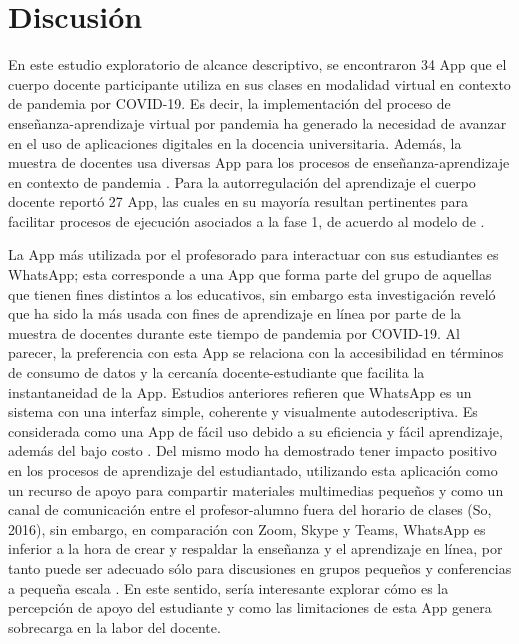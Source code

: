 \documentclass[spanish]{textolivre}
\begin{document}
\section{Discusión}
En este estudio exploratorio de alcance descriptivo, se encontraron 34 App que el cuerpo docente participante utiliza en sus clases en modalidad virtual en contexto de pandemia por COVID-19. Es decir, la implementación del proceso de enseñanza-aprendizaje virtual por pandemia ha generado la necesidad de avanzar en el uso de aplicaciones digitales en la docencia universitaria. Además, la muestra de docentes usa diversas App para los procesos de enseñanza-aprendizaje en contexto de pandemia \cite{zamora-antunano2021, almarzooq2020, budianto2021, akaloo2021, pramana2021}. Para la autorregulación del aprendizaje el cuerpo docente reportó 27 App, las cuales en su mayoría resultan pertinentes para facilitar procesos de ejecución asociados a la fase 1, de acuerdo al modelo de \textcite[p. 142]{zimmerman2013}.

La App más utilizada por el profesorado para interactuar con sus estudiantes es WhatsApp; esta corresponde a una App que forma parte del grupo de aquellas que tienen fines distintos a los educativos, sin embargo esta investigación reveló que ha sido la más usada con fines de aprendizaje en línea por parte de la muestra de docentes durante este tiempo de pandemia por COVID-19. Al parecer, la preferencia con esta App se relaciona con la accesibilidad en términos de consumo de datos y la cercanía docente-estudiante que facilita la instantaneidad de la App. Estudios anteriores refieren que WhatsApp es un sistema con una interfaz simple,  coherente y visualmente autodescriptiva. Es considerada como una App de fácil uso debido a su eficiencia y fácil aprendizaje, además del bajo costo \cite{correia2020}. Del mismo modo ha demostrado tener impacto positivo en los procesos de aprendizaje del estudiantado, utilizando esta aplicación como un recurso de apoyo para compartir materiales multimedias pequeños y como un canal de comunicación entre el profesor-alumno fuera del horario de clases (So, 2016), sin embargo, en comparación con Zoom, Skype y Teams, WhatsApp es inferior a la hora de crear y respaldar la enseñanza y el aprendizaje en línea, por tanto puede ser adecuado sólo para discusiones en grupos pequeños y conferencias a pequeña escala \cite{correia2020}. En este sentido, sería interesante explorar cómo es la percepción de apoyo del estudiante y como las limitaciones de esta App genera sobrecarga en la labor del docente.
\end{document}
